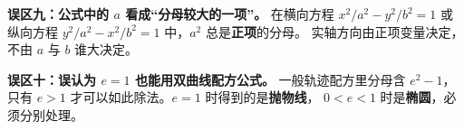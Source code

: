 \clearpage
\begin{trapbox}

\medskip
\textbf{误区九：公式中的 $a$ 看成“分母较大的一项”。}
在横向方程 $x^2/a^2-y^2/b^2=1$ 或纵向方程
$y^2/a^2-x^2/b^2=1$ 中，$a^2$ 总是\textbf{正项}的分母。
实轴方向由正项变量决定，不由 $a$ 与 $b$ 谁大决定。

\textbf{误区十：误认为 $e=1$ 也能用双曲线配方公式。}
一般轨迹配方里分母含 $e^2-1$，
只有 $e>1$ 才可以如此除法。$e=1$ 时得到的是\textbf{抛物线}，
$0<e<1$ 时是\textbf{椭圆}，必须分别处理。

\end{trapbox}
